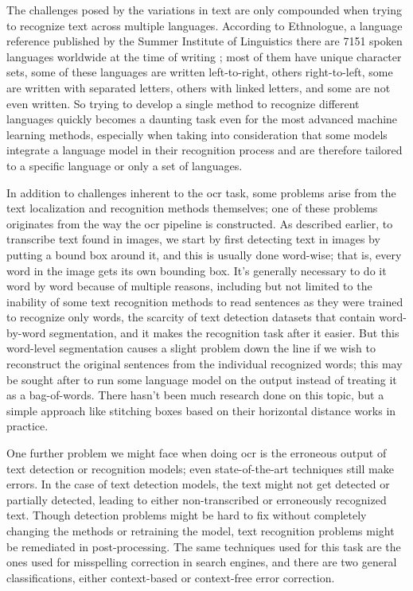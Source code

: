 The challenges posed by the variations in text are only compounded when trying to recognize text across multiple languages. According to Ethnologue, a language reference published by the Summer Institute of Linguistics there are 7151 spoken languages worldwide at the time of writing \cite{noauthor_how_2016}; most of them have unique character sets, some of these languages are written left-to-right, others right-to-left, some are written with separated letters, others with linked letters, and some are not even written. So trying to develop a single method to recognize different languages quickly becomes a daunting task even for the most advanced machine learning methods, especially when taking into consideration that some models integrate a language model in their recognition process and are therefore tailored to a specific language or only a set of languages.

In addition to challenges inherent to the \gls{ocr} task, some problems arise from the text localization and recognition methods themselves; one of these problems originates from the way the \gls{ocr} pipeline is constructed. As described earlier, to transcribe text found in images, we start by first detecting text in images by putting a bound box around it, and this is usually done word-wise; that is, every word in the image gets its own bounding box. It's generally necessary to do it word by word because of multiple reasons, including but not limited to the inability of some text recognition methods to read sentences as they were trained to recognize only words, the scarcity of text detection datasets that contain word-by-word segmentation, and it makes the recognition task after it easier. But this word-level segmentation causes a slight problem down the line if we wish to reconstruct the original sentences from the individual recognized words; this may be sought after to run some language model on the output instead of treating it as a bag-of-words. There hasn't been much research done on this topic, but a simple approach like stitching boxes based on their horizontal distance works in practice.

One further problem we might face when doing \gls{ocr} is the erroneous output of text detection or recognition models; even state-of-the-art techniques still make errors. In the case of text detection models, the text might not get detected or partially detected, leading to either non-transcribed or erroneously recognized text. Though detection problems might be hard to fix without completely changing the methods or retraining the model, text recognition problems might be remediated in post-processing. The same techniques used for this task are the ones used for misspelling correction in search engines, and there are two general classifications, either context-based or context-free error correction.

